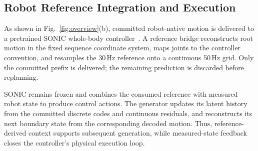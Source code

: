 \subsection{Robot Reference Integration and Execution}
\label{sec:robot_execution}

As shown in Fig.~\ref{fig:overview}(b), committed
robot-native motion is delivered to a pretrained
SONIC whole-body controller~\cite{luo2026sonic}.
A reference bridge reconstructs root motion in the
fixed sequence coordinate system, maps joints to
the controller convention, and resamples the
30\,Hz reference onto a continuous 50\,Hz grid.
Only the committed prefix is delivered;
the remaining prediction is discarded before replanning.

SONIC remains frozen and combines the consumed reference
with measured robot state to produce control actions.
The generator updates its latent history from the
committed discrete codes and continuous residuals,
and reconstructs its next boundary state from the
corresponding decoded motion.
Thus, reference-derived context supports subsequent
generation, while measured-state feedback closes
the controller's physical execution loop.

% 
